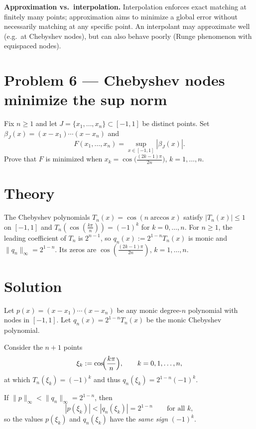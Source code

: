 \documentclass[12pt,a4paper]{article}
\theoremstyle{plain}
\theoremstyle{definition}
\theoremstyle{remark}
\theoremstyle{remark}
\begin{document}
\bigskip

\noindent\textbf{Approximation vs.\ interpolation.}
Interpolation enforces exact matching at finitely many points; approximation aims to minimize a global error without necessarily matching at any specific point. An interpolant may approximate well (e.g.\ at Chebyshev nodes), but can also behave poorly (Runge phenomenon with equispaced nodes).


\section*{Problem 6 — Chebyshev nodes minimize the sup norm}

Fix $n\ge1$ and let $J=\{x_1,\dots,x_n\}\subset[-1,1]$ be distinct points.
Set $\beta_J(x)=(x-x_1)\cdots(x-x_n)$ and
\[
F(x_1,\dots,x_n)=\sup_{x\in[-1,1]}|\beta_J(x)|.
\]
Prove that $F$ is minimized when $x_k=\cos\!\bigl(\tfrac{(2k-1)\pi}{2n}\bigr)$, $k=1,\dots,n$.

\bigskip

\section*{Theory}
The Chebyshev polynomials $T_n(x)=\cos(n\arccos x)$ satisfy $|T_n(x)|\le1$ on $[-1,1]$ and
$T_n(\cos(\frac{k\pi}{n}))=(-1)^k$ for $k=0,\dots,n$. For $n\ge1$, the leading coefficient of $T_n$ is $2^{n-1}$,
so $q_n(x):=2^{1-n}T_n(x)$ is monic and $\|q_n\|_\infty=2^{1-n}$. Its zeros are
$\cos(\frac{(2k-1)\pi}{2n})$, $k=1,\dots,n$.

\bigskip

\section*{Solution}

Let $p(x)=(x-x_1)\cdots(x-x_n)$ be any monic degree-$n$ polynomial with nodes in $[-1,1]$.
Let $q_n(x)=2^{1-n}T_n(x)$ be the monic Chebyshev polynomial.

\smallskip

Consider the $n+1$ points
\[
\xi_k:=\cos\!\Bigl(\frac{k\pi}{n}\Bigr),\qquad k=0,1,\dots,n,
\]
at which $T_n(\xi_k)=(-1)^k$ and thus $q_n(\xi_k)=2^{1-n}(-1)^k$.

\smallskip

If $\|p\|_\infty<\|q_n\|_\infty=2^{1-n}$, then
\[
|p(\xi_k)|<|q_n(\xi_k)|=2^{1-n}\qquad\text{for all }k,
\]
so the values $p(\xi_k)$ and $q_n(\xi_k)$ have the \emph{same sign} $(-1)^k$.
\end{document}
